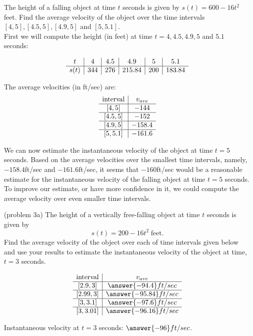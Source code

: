 \documentclass[handout]{ximera}
\begin{document}
\begin{example}[example 3]
The height of a falling object at time $t$ seconds is given by $s(t) = 600-16t^2$ feet.
Find the average velocity of the object over the time 
intervals $[4, 5], [4.5, 5], [4.9, 5]$ and $[5, 5.1]$.\\
First we will compute the height (in feet) at time $t = 4, 4.5, 4.9, 5$ and $5.1$ seconds:
  
\[
\begin{array}{ c | c | c | c | c | c }
   t& 4 & 4.5 & 4.9 & 5 & 5.1 \\ 
	\hline
	s(t) & 344 & 276 & 215.84 & 200 & 183.84
\end{array}
\]

The average velocities (in ft/sec) are:
\[
\begin{array}{ c | c  }
   \text{interval}& v_{ave} \\ 
	\hline
	[4,5] & -144 \\
	\hline
	[4.5,5] & -152 \\
	\hline
	[4.9,5] & -158.4 \\
	\hline
	[5, 5.1] & -161.6
\end{array}
\]

We can now estimate the instantaneous velocity of the object at time $t = 5$ seconds.  Based on the 
average velocities over the smallest time intervals, namely, $-158.4$ft/sec 
and $-161.6$ft/sec, it seems that $-160$ft/sec would be a reasonable estimate 
for the instantaneous velocity of the falling object at time $t = 5$ seconds.
To improve our estimate, or have more confidence in it, we could compute the average velocity over 
even smaller time intervals.

\end{example}

\begin{problem}(problem 3a)
The height of a vertically free-falling object at time $t$ seconds is given by
\[
s(t) = 200 - 16t^2 \; \text{feet}.
\]
Find the average velocity of the object over each of time intervals given below and use your 
results to estimate the instantaneous velocity
of the object at time, $t = 3$ seconds.

\[
\begin{array}{ c | c  }
   \text{interval}& v_{ave} \\ 
	\hline
	[2.9, 3] & \answer{-94.4}ft/sec \\
	\hline
	[2.99, 3] & \answer{-95.84}ft/sec \\
	\hline
	[3, 3.1] & \answer{-97.6}ft/sec \\
	\hline
	[3, 3.01] & \answer{-96.16}ft/sec
\end{array}
\]


Instantaneous velocity at $t = 3$ seconds: $\answer{-96}ft/sec$.

\end{problem}
\end{document}
